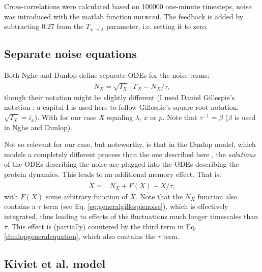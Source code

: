 %
Cross-correlations were calculated based on 100000 one-minute timesteps, noise was introduced with the matlab function \texttt{normrnd}.
% 
The feedback is added by subtracting $0.27$ from the $T_{x\rightarrow\lambda}$ parameter, i.e. setting it to zero.

\subsection*{Separate noise equations}

Both Nghe and Dunlop define separate ODEs for the noise terms:
%
\begin{align}
\label{eq:generalgillespienoise}
\dot{N}_X = \sqrt{I_X} \cdot \Gamma_X - N_X/\tau
,
\end{align}
%
though their notation might be slightly different (I used Daniel Gillespie's notation \cite{Gillespie1996}; a capital I is used here to follow Gillespie's square root notation, $\sqrt{I_X}=i_x$).
With for our case $X$ equaling $\lambda$, $x$ or $p$. Note that $\tau^{-1}=\beta$ ($\beta$ is used in Nghe and Dunlop).

Not so relevant for our case, but noteworthy, is that in the Dunlop model, which models a completely different process than the one described here \cite{Dunlop2008}, the \textit{solutions} of the ODEs describing the noise are plugged into the ODEs describing the protein dynamics. This leads to an additional memory effect.
%
That is:
%
\begin{align}
\label{dunlopgeneralequation}
\dot{X} = & N_X  + F(X) + X/\tau
,
\end{align}
%
with $F(X)$ some arbitrary function of $X$. 
Note that the $N_X$ function also contains a $\tau$ term (see Eq. \ref{eq:generalgillespienoise}), which is effectively integrated, thus leading to effects of the fluctuations much longer timescales than $\tau$. 
This effect is (partially) countered by the third term in Eq. \ref{dunlopgeneralequation}, which also contains the $\tau$ term.

\subsection*{Kiviet et al. model}

